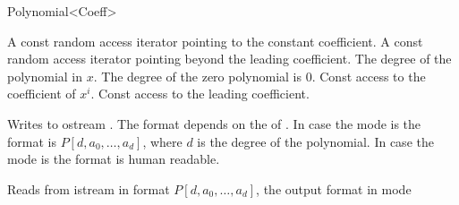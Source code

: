 \begin{ccRefClass}{Polynomial<Coeff>}
\ccTypes

\ccOperations

{A const random access iterator pointing to the constant coefficient.} \ccGlue
{}
{A const random access iterator pointing beyond the leading coefficient.}\ccGlue
{}
{The degree of the polynomial in $x$. The degree of the zero polynomial is 0.}\ccGlue
{}
{Const access to the coefficient of $x^i$.}\ccGlue
{}
{Const access to the leading coefficient.}\ccGlue


{Writes  to ostream . 
The format depends on the  of .
In case the mode is  the format is $P[d,a_0,\dots,a_d]$,
where $d$ is the degree of the polynomial. 
In case the mode is  the format is human readable.}


{Reads  from istream  in format $P[d,a_0,\dots,a_d]$,  
the output format in mode  }


\end{ccRefClass}
